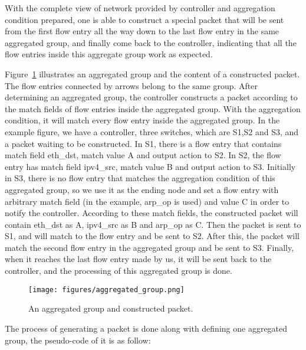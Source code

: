 With the complete view of network provided by controller and aggregation condition prepared, one is able to construct a special packet that will be sent from the first flow entry all the way down to the last flow entry in the same aggregated group, and finally come back to the controller, indicating that all the flow entries inside this aggregate group work as expected. 

Figure~\ref{aggregated_group} illustrates an aggregated group and the content of a constructed packet. The flow entries connected by arrows belong to the same group. After determining an aggregated group, the controller constructs a packet according to the match fields of flow entries inside the aggregated group. With the aggregation condition, it will match every flow entry inside the aggregated group. In the example figure, we have a controller, three switches, which are S1,S2 and S3, and a packet waiting to be constructed. In S1, there is a flow entry that contains match field eth\_dst, match value A and output action to S2. In S2, the flow entry has match field ipv4\_src, match value B and output action to S3. Initially in S3, there is no flow entry that matches the aggregation condition of this aggregated group, so we use it as the ending node and set a flow entry with arbitrary match field (in the example, arp\_op is used) and value C in order to notify the controller. According to these match fields, the constructed packet will contain eth\_dst as A, ipv4\_src as B and arp\_op as C. Then the packet is sent to S1, and will match to the flow entry and be sent to S2. After this, the packet will match the second flow entry in the aggregated group and be sent to S3. Finally, when it reaches the last flow entry made by us, it will be sent back to the controller, and the processing of this aggregated group is done. 
\begin{figure}[H]
\begin{center} 
\texttt{[image: figures/aggregated\_group.png]}
\end{center}
\caption{An aggregated group and constructed packet.}
\label{aggregated_group}
\end{figure}

The process of generating a packet is done along with defining one aggregated group, the pseudo-code of it is as follow:

